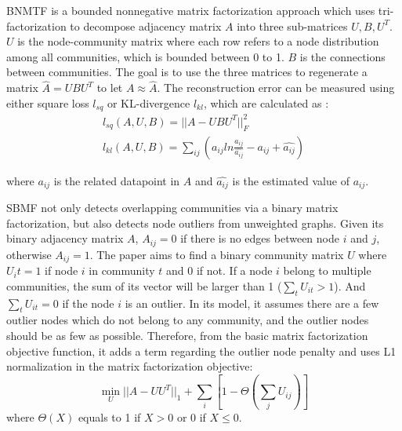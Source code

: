 BNMTF \cite{zhang2012overlapping} is a bounded nonnegative matrix factorization approach which uses tri-factorization to decompose adjacency matrix $A$ into three sub-matrices $U,B,U^T$.  $U$ is the node-community matrix where each row refers to a node distribution among all communities, which is bounded between 0 to 1. $B$ is the connections between communities. The goal is to use the three matrices to regenerate a matrix $\hat{A} = UBU^T$ to let $A \approx \hat{A}$. The reconstruction error can be measured using either square loss $l_{sq}$ or KL-divergence $l_{kl}$, which are calculated as :
\begin{equation}
\begin{aligned} 
l_{sq}(A,U,B) = ||A-UBU^T||^2_F \\
l_{kl}(A,U,B) = \sum_{ij}(a_{ij}ln\frac{a_{ij}}{\hat{a_{ij}}} - a_{ij} + \hat{a_{ij}})
\end{aligned} 
\end{equation}

where $a_{ij}$ is the related datapoint in $A$ and $\hat{a_{ij}}$ is the estimated value of $a_{ij}$.

SBMF \cite{zhang2013overlapping} not only detects overlapping communities via a binary matrix factorization, but also detects node outliers from unweighted graphs. Given its binary adjacency matrix $A$, $A_{ij} = 0$ if there is no edges between node $i$ and $j$, otherwise $A_{ij} = 1$. The paper aims to find a binary community matrix $U$ where $U_it = 1$ if node $i$ in community $t$ and 0 if not. If a node $i$ belong to multiple communities, the sum of its vector will be larger than 1 ($\sum_{t} U_{it} > 1$). And $\sum_{t} U_{it} = 0$ if the node $i$ is an outlier. In its model, it assumes there are a few outlier nodes which do not belong to any community, and the outlier nodes should be as few as possible. Therefore, from the basic matrix factorization objective function, it adds a term regarding the outlier node penalty and uses L1 normalization in the matrix factorization objective:
\begin{equation}
\min_{U} ||A- UU^T||_1 + \sum_i [1-\Theta(\sum_j U_{ij})]
\end{equation}
 where $\Theta(X)$ equals to 1 if $X>0$ or 0 if $X \leq 0$.
 
